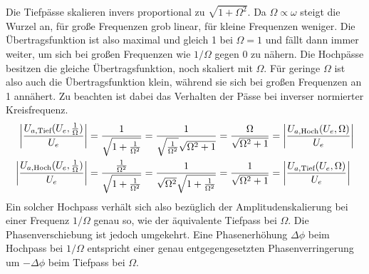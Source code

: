 Die Tiefpässe skalieren invers proportional zu $\sqrt{1 + \Omega^2}$. Da $\Omega \propto \omega$ steigt die Wurzel an, für große Frequenzen grob linear, für kleine Frequenzen weniger.
Die Übertragsfunktion ist also maximal und gleich 1 bei $\Omega = 1$ und fällt dann immer weiter, um sich bei großen Frequenzen wie $1/\Omega$ gegen 0 zu nähern.
Die Hochpässe besitzen die gleiche Übertragsfunktion, noch skaliert mit $\Omega$.
Für geringe $\Omega$ ist also auch die Übertragsfunktion klein, während sie sich bei großen Frequenzen an 1 annähert.
Zu beachten ist dabei das Verhalten der Pässe bei inverser normierter Kreisfrequenz.
\begin{align}
    \abs{\frac{U_{a,\text{Tief}}(U_e, \frac{1}{\Omega})}{U_e}} &= \frac{1}{\sqrt{1+\frac{1}{\Omega^2}}}
    = \frac{1}{\sqrt{\frac{1}{\Omega^2}}\sqrt{\Omega^2+1}} = \frac{\Omega}{\sqrt{\Omega^2+1}} 
    = \abs{\frac{U_{a,\text{Hoch}}(U_e, \Omega)}{U_e}}\\
    \abs{\frac{U_{a,\text{Hoch}}(U_e, \frac{1}{\Omega})}{U_e}} &
    = \frac{\frac{1}{\Omega^2}}{\sqrt{1+\frac{1}{\Omega^2}}}
    = \frac{1}{\sqrt{{\Omega^2}}\sqrt{1+\frac{1}{\Omega^2}}} = \frac{1}{\sqrt{\Omega^2+1}} 
    = \abs{\frac{U_{a,\text{Tief}}(U_e, \Omega)}{U_e}}
\end{align}
Ein solcher Hochpass verhält sich also bezüglich der Amplitudenskalierung bei einer Frequenz $1/\Omega$ genau so, wie der äquivalente Tiefpass bei $\Omega$.
Die Phasenverschiebung ist jedoch umgekehrt. Eine Phasenerhöhung $\Delta \phi$ beim Hochpass bei $1/\Omega$ entspricht einer genau entgegengesetzten Phasenverringerung um $-\Delta \phi$ beim Tiefpass bei $\Omega$.
%
%